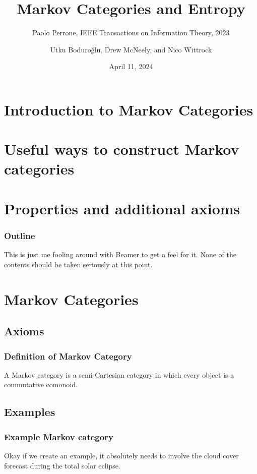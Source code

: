 \documentclass{beamer}
\title{Markov Categories and Entropy}
\subtitle{Paolo Perrone, IEEE Transactions on Information Theory, 2023}
\author{Utku Boduroğlu, Drew McNeely, and Nico Wittrock}
\institute{Adjoint School 2024}
\date{April 11, 2024}
\begin{document}
\begin{frame}
\titlepage
\end{frame}

\begin{frame}
    \tableofcontents
\end{frame}

\section{Introduction to Markov Categories}


\section{Useful ways to construct Markov categories}

\section{Properties and additional axioms}


\begin{frame}
\frametitle{Outline}
This is just me fooling around with Beamer to get a feel for it.
None of the contents should be taken seriously at this point.
\tableofcontents
\end{frame}

\section{Markov Categories}
\subsection{Axioms}

\begin{frame}
\frametitle{Definition of Markov Category}
\begin{definition}
	A Markov category is a semi-Cartesian category in which every object is a commutative comonoid.
\end{definition}
\end{frame}

\subsection{Examples}

\begin{frame}
	\frametitle{Example Markov category}
	Okay if we create an example, it absolutely needs to involve the cloud cover forecast during the total solar eclipse.
\end{frame}
\end{document}
